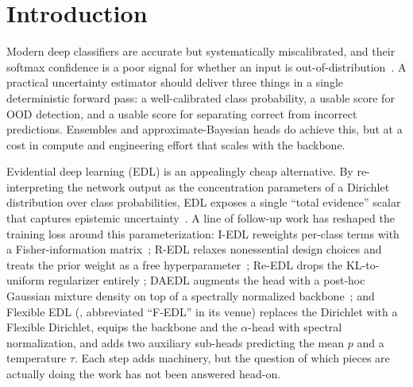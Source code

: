 \documentclass[review,5p,times]{elsarticle}
\begin{document}
\section{Introduction}\label{sec:intro}

Modern deep classifiers are accurate but systematically miscalibrated, and
their softmax confidence is a poor signal for whether an input is
out-of-distribution~\citep{guo2017calibration,hendrycks2017baseline}.
A practical uncertainty estimator should deliver three things in a single
deterministic forward pass: a well-calibrated class probability, a usable
score for OOD detection, and a usable score for separating correct from
incorrect predictions. Ensembles and approximate-Bayesian heads do achieve
this, but at a cost in compute and engineering effort that scales with the
backbone.

Evidential deep learning (EDL) is an appealingly cheap alternative. By
re-interpreting the network output as the concentration parameters of a
Dirichlet distribution over class probabilities, EDL exposes a single
``total evidence'' scalar that captures epistemic
uncertainty~\citep{sensoy2018edl,malinin2018prior,amini2020evidential}.
A line of follow-up work has reshaped the training loss around this
parameterization: I-EDL reweights per-class terms with a Fisher-information
matrix~\citep{deng2023iedl}; R-EDL relaxes nonessential design choices and
treats the prior weight as a free hyperparameter~\citep{chen2024redl};
Re-EDL drops the KL-to-uniform regularizer entirely
\citep{chen2025reedl}; DAEDL augments the head with a
post-hoc Gaussian mixture density on top of a spectrally normalized
backbone~\citep{yoon2024daedl}; and Flexible EDL (\citealp{yoon2025fedl},
abbreviated ``F-EDL'' in its venue) replaces the Dirichlet with a Flexible
Dirichlet, equips the backbone and the $\alpha$-head with spectral
normalization, and adds two auxiliary sub-heads predicting the mean $p$
and a temperature $\tau$. Each step adds machinery, but the question of
which pieces are actually doing the work has not been answered head-on.
\end{document}
